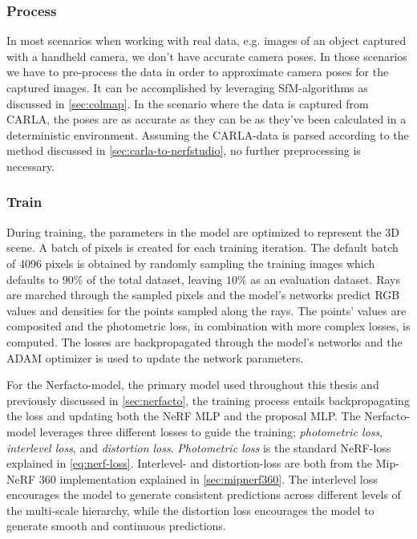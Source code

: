 \subsubsection{Process}

In most scenarios when working with real data, e.g. images of an object captured with a handheld camera, we don't have accurate camera poses. In those scenarios we have to pre-process the data in order to approximate camera poses for the captured images. It can be accomplished by leveraging SfM-algorithms as discussed in \autoref{sec:colmap}. In the scenario where the data is captured from CARLA, the poses are as accurate as they can be as they've been calculated in a deterministic environment. Assuming the CARLA-data is parsed according to the method discussed in \autoref{sec:carla-to-nerfstudio}, no further preprocessing is necessary.

\subsubsection{Train}
During training, the parameters in the model are optimized to represent the 3D scene. A batch of pixels is created for each training iteration. The default batch of 4096 pixels is obtained by randomly sampling the training images which defaults to $90\%$ of the total dataset, leaving $10\%$ as an evaluation dataset. Rays are marched through the sampled pixels and the model's networks predict RGB values and densities for the points sampled along the rays. The points' values are composited and the photometric loss, in combination with more complex losses, is computed. The losses are backpropagated through the model's networks and the ADAM optimizer\cite{adam} is used to update the network parameters.

For the Nerfacto-model, the primary model used throughout this thesis and previously discussed in \autoref{sec:nerfacto}, the training process entails backpropagating the loss and updating both the NeRF MLP and the proposal MLP. The Nerfacto-model leverages three different losses to guide the training; \textit{photometric loss}, \textit{interlevel loss}, and \textit{distortion loss}. \textit{Photometric loss} is the standard NeRF-loss explained in \autoref{eq:nerf-loss}. Interlevel- and distortion-loss are both from the Mip-NeRF 360\cite{barron_mip-nerf_2022} implementation explained in \autoref{sec:mipnerf360}. The interlevel loss encourages the model to generate consistent predictions across different levels of the multi-scale hierarchy, while the distortion loss encourages the model to generate smooth and continuous predictions.

